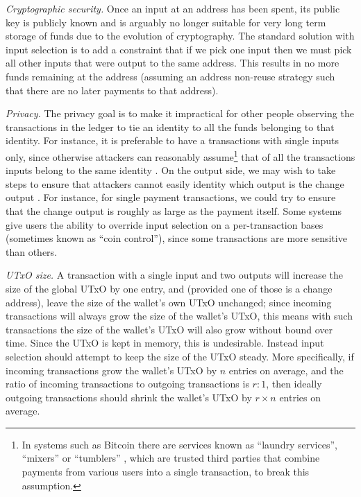 \documentclass{article}
\theoremstyle{definition}{
  \newtheorem{lemma}{Lemma}[section] %
  \newtheorem{definition}[lemma]{Definition}
}
\theoremstyle{theorem}{
  \newtheorem{invariant}[lemma]{Invariant}
  \newtheorem{proofobligation}[lemma]{Proof Obligation}
}
\numberwithin{equation}{lemma}
\begin{document}
\emph{Cryptographic security.}
Once an input at an address has been spent, its public key is publicly
known and is arguably no longer suitable for very long term storage of funds due
to the evolution of cryptography. The standard solution with input selection is
to add a constraint that if we pick one input then we must pick all other inputs
that were output to the same address. This results in no more funds remaining at
the address (assuming an address non-reuse strategy such that there are no later
payments to that address).

\emph{Privacy.}
The privacy goal is to make it impractical for other people observing the
transactions in the ledger to tie an identity to all the funds belonging to that
identity. For instance, it is preferable to have a transactions with single
inputs only, since otherwise attackers can reasonably assume\footnote{In systems
such as Bitcoin there are services known as ``laundry services'', ``mixers'' or
``tumblers'' \citep{10.1007/978-3-319-70290-2_18}, which are trusted third
parties that combine payments from various users into a single transaction, to
break this assumption.}  that of all the transactions inputs belong to the same
identity \citep{fergal}. On the output side, we may wish to take steps to ensure
that attackers cannot easily identity which output is the change output
\citep{8260674}. For instance, for single payment transactions, we could try to
ensure that the change output is roughly as large as the payment itself. Some
systems give users the ability to override input selection on a per-transaction
bases (sometimes known as ``coin control''), since some transactions are more
sensitive than others.

\emph{UTxO size.}
A transaction with a single input and two outputs will increase the size of the
global UTxO by one entry, and (provided one of those is a change address), leave
the size of the wallet's own UTxO unchanged; since incoming transactions will
always grow the size of the wallet's UTxO, this means with such transactions the
size of the wallet's UTxO will also grow without bound over time. Since the UTxO
is kept in memory, this is undesirable. Instead input selection should attempt
to keep the size of the UTxO steady. More specifically, if incoming transactions
grow the wallet's UTxO by $n$ entries on average, and the ratio of incoming
transactions to outgoing transactions is $r : 1$, then ideally outgoing
transactions should shrink the wallet's UTxO by $r \times n$ entries on average.
\end{document}
